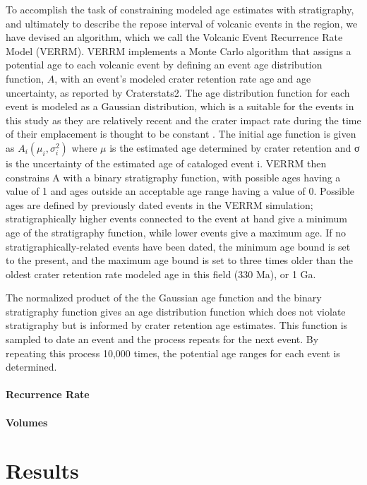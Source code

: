 \documentclass[12pt,letter]{article}
\begin{document}
To accomplish the task of constraining modeled age estimates with stratigraphy, and ultimately to describe the repose interval of volcanic events in the region, we have devised an algorithm, which we call the Volcanic Event Recurrence Rate Model (VERRM). VERRM implements a Monte Carlo algorithm that assigns a potential age to each volcanic event by defining an event age distribution function, $A$, with an event's modeled crater retention rate age and age uncertainty, as reported by Craterstats2. The age distribution function for each event is modeled as a Gaussian distribution, which is a suitable for the events in this study as they are relatively recent and the crater impact rate during the time of their emplacement is thought to be constant \citep{vaucher2009volcanic}. The initial age function is given as $A_i(\mu_i,\sigma_i^2)$ where $\mu$ is the estimated age determined by crater retention and σ is the uncertainty of the estimated age of cataloged event i. VERRM then constrains A with a binary stratigraphy function, with possible ages having a value of 1 and ages outside an acceptable age range having a value of 0. Possible ages are defined by previously dated events in the VERRM simulation; stratigraphically higher events connected to the event at hand give a minimum age of the stratigraphy function, while lower events give a maximum age. If no stratigraphically-related events have been dated, the minimum age bound is set to the present, and the maximum age bound is set to three times older than the oldest crater retention rate modeled age in this field (330 Ma), or 1 Ga.

The normalized product of the the Gaussian age function and the binary stratigraphy function gives an age distribution function which does not violate stratigraphy but is informed by crater retention age estimates. This function is sampled to date an event and the process repeats for the next event. By repeating this process 10,000 times, the potential age ranges for each event is determined.

\paragraph{Recurrence Rate}

\paragraph{Volumes}


\section{Results}
\end{document}
